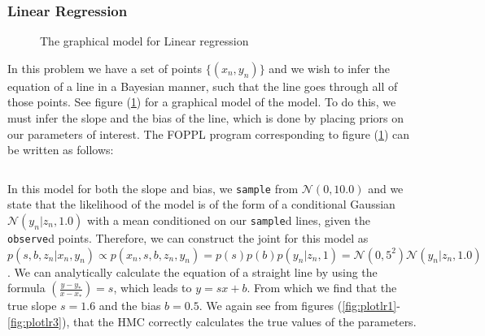 \subsubsection{Linear Regression}
\begin{figure}[ht]
	\begin{center}
		
	\end{center}
	\caption{The graphical model for Linear regression}
    \label{fig:lrgraph}
\end{figure}
In this problem we have a set of points $\{(x_{n},y_{n})\}$ and we wish to infer the equation of a line in a Bayesian manner, such that the line goes through all of those points. See figure (\ref{fig:lrgraph}) for a graphical model of the model. To do this, we must infer the slope and the bias of the line, which is done by placing priors on our parameters of interest. The FOPPL program corresponding to figure (\ref{fig:lrgraph}) can be written as follows:\inputminted{clojure}{code/linearregression.clj}In this model for both the slope and bias, we \texttt{sample} from $\mathcal{N}(0,10.0)$ and we state that the likelihood of the model is of the form of a conditional Gaussian $\mathcal{N}(y_{n}| z_{n}, 1.0)$ with a mean conditioned on our \texttt{sample}d lines, given the \texttt{observe}d points. Therefore, we can construct the joint for this model as $ p(s,b,z_{n} | x_{n}, y_{n}) \propto p(x_{n},s,b,z_{n}, y_{n}) = p(s)p(b)p(y_{n} | z_{n}, 1) =\mathcal{N}(0,5^{2})\mathcal{N}(y_{n}|z_{n},1.0)$. We can analytically calculate the equation of a straight line by using the formula $\left(\frac{y - y_{*}}{x - x_{*}}\right) = s$, which leads to $y = sx + b$. From which we find that the true slope $s = 1.6$ and the bias $b = 0.5$. We again see from figures (\ref{fig:plotlr1}-\ref{fig:plotlr3}), that the HMC correctly calculates the true values of the parameters.\\

